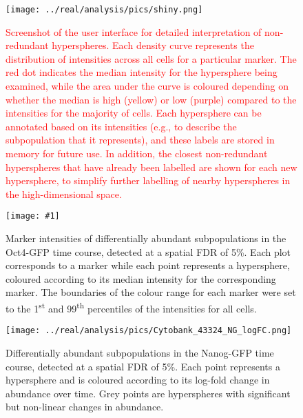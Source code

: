 \documentclass{article}
\newcommand\revised[1]{\textcolor{red}{#1}}
\begin{document}
\begin{figure}[tbp]
    \begin{center}
        \texttt{[image: ../real/analysis/pics/shiny.png]}
    \end{center}
    \caption{\revised{Screenshot of the user interface for detailed interpretation of non-redundant hyperspheres.
            Each density curve represents the distribution of intensities across all cells for a particular marker.
            The red dot indicates the median intensity for the hypersphere being examined, while the area under the curve is coloured depending on whether the median is high (yellow) or low (purple) compared to the intensities for the majority of cells.
            Each hypersphere can be annotated based on its intensities (e.g., to describe the subpopulation that it represents), and these labels are stored in memory for future use.
            In addition, the closest non-redundant hyperspheres that have already been labelled are shown for each new hypersphere, to simplify further labelling of nearby hyperspheres in the high-dimensional space.
        }
}
\label{fig:shiny}
\end{figure}

\clearpage
\newcommand{\bigfigopt}[1]{\texttt{[image: \#1]}}

\begin{figure}[p]
    \begin{center}
    \bigfigopt{../real/analysis/pics/Cytobank_43324_4FI_markers.png}
    \end{center}
    \caption{
        Marker intensities of differentially abundant subpopulations in the Oct4-GFP time course, detected at a spatial FDR of 5\%.
        Each plot corresponds to a marker while each point represents a hypersphere, coloured according to its median intensity for the corresponding marker.
        The boundaries of the colour range for each marker were set to the 1\textsuperscript{st} and 99\textsuperscript{th} percentiles of the intensities for all cells.
    }
    \label{fig:oct4_markers}
\end{figure}

\begin{figure}[p]
    \begin{center}
    \texttt{[image: ../real/analysis/pics/Cytobank\_43324\_NG\_logFC.png]}
    \end{center}
    \caption{
        Differentially abundant subpopulations in the Nanog-GFP time course, detected at a spatial FDR of 5\%.
        Each point represents a hypersphere and is coloured according to its log-fold change in abundance over time.
        Grey points are hyperspheres with significant but non-linear changes in abundance.
    }
\end{figure}
\end{document}
